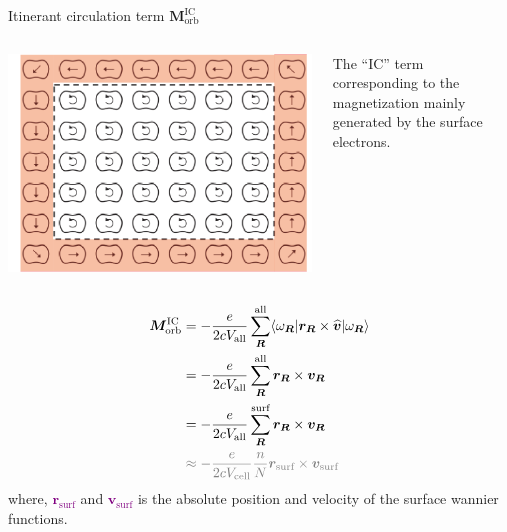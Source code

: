\documentclass{beamer}
\newcommand{\purple}{\textcolor{purple}}
\begin{document}
    \begin{frame}[fragile,t]{Itinerant circulation term \(\bm{M}_{\text{orb}}^{\text{IC}}\)}
      \scriptsize
      \begin{columns}
        \begin{column}{0.3\textwidth}
          \includegraphics[width=\textwidth]{figure/edge-solid2-edge.png}
        \end{column}
        \begin{column}{0.5\textwidth}
          \begin{block}{}
            The ``IC'' term corresponding to the magnetization mainly generated by the surface electrons.
          \end{block}
        \end{column}
      \end{columns}
      \begin{equation}\begin{aligned}
        \bm{M}_{\text{orb}}^{\text{IC}} &= -\frac{e}{2cV_{\text{all}}}\sum_{\bm{R}}^{\text{all}} \langle\omega_{\bm{R}}|\bm{r}_{\bm{R}}\times\widehat{\bm{v}}|\omega_{\bm{R}}\rangle\\
        &= -\frac{e}{2cV_{\text{all}}}\sum_{\bm{R}}^{\text{all}} \bm{r}_{\bm{R}}\times\bm{v}_{\bm{R}}\\
        &= -\frac{e}{2cV_{\text{all}}}\sum_{\bm{R}}^{\text{surf}} \bm{r}_{\bm{R}}\times\bm{v}_{\bm{R}}\\
        & \;{\color{gray}\approx -\frac{e}{2cV_{\text{cell}}} \frac{n}{N}\bm{r}_{\text{surf}}\times\bm{v}_{\text{surf}}}
      \end{aligned}\end{equation}
      where, \purple{\(\bm{r}_{\text{surf}}\)} and \purple{\(\bm{v}_{\text{surf}}\)} is the absolute position and velocity of the surface wannier functions.
    \end{frame}
    
\end{document}

